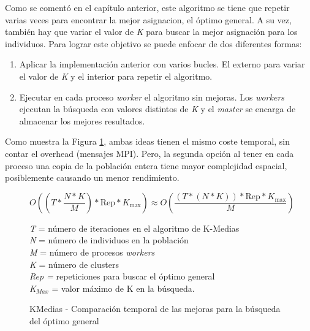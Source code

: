 		\vspace{0.2cm}
		
		Como se comentó en el capítulo anterior, este algoritmo se tiene que repetir varias veces para encontrar la mejor asignacion, el óptimo general. A su vez, también hay que variar el valor de \textit{K} para buscar la mejor asignación para los individuos. Para lograr este objetivo se puede enfocar de dos diferentes formas:
		
		\begin{enumerate}
			\item Aplicar la implementación anterior con varios bucles. El externo para variar el valor de \textit{K} y el interior para repetir el algoritmo.
			\item Ejecutar en cada proceso \textit{worker} el algoritmo sin mejoras. Los \textit{workers} ejecutan la búsqueda con valores distintos de \textit{K} y el \textit{master} se encarga de almacenar los mejores resultados.
		\end{enumerate}
		
		Como muestra la Figura \ref{fig:KMedias_comp}, ambas ideas tienen el mismo coste temporal, sin contar el overhead (mensajes MPI). Pero, la segunda opción al tener en cada proceso una copia de la población entera tiene mayor complejidad espacial, posiblemente causando un menor rendimiento.
		
		\begin{figure} [!h]
			\begin{mdframed}[roundcorner=5pt]
				\[
				O\left((T * \frac{N * K}{M}) * \text{Rep} * K_{\text{max}}\right) \approx O\left(\frac{{(T * (N * K)) * \text{Rep} * K_{\text{max}}}}{{M}}\right)
				\]
				
				
				
				\begin{tcolorbox}[boxrule=0.5pt, fontupper=\small]
					
					\textit{T} = número de iteraciones en el algoritmo de K-Medias\\
					\textit{N} = número de individuos en la población\\
					\textit{M} = número de procesos \textit{workers}\\
					\textit{K} = número de clusters\\
					\textit{Rep = }repeticiones para buscar el óptimo general\\
					\textit{K\(_{Max}\)} = valor máximo de K en la búsqueda.				
					
				\end{tcolorbox}
				
			\end{mdframed}
			\caption{KMedias - Comparación temporal de las mejoras para la búsqueda del óptimo general}
			\label{fig:KMedias_comp}
		\end{figure}
		
